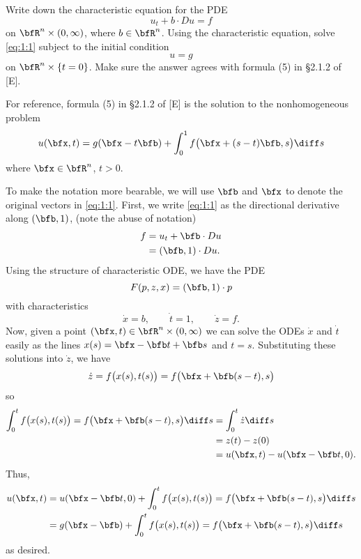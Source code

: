 \begin{problem}
  Write down the characteristic equation for the PDE
  \[
    \label{eq:1:1}
    \tag{\(*\)}
    u_t+b\cdot Du=f
  \]
  on \(\bfR^n\times(0,\infty)\), where \(b\in\bfR^n\). Using the
  characteristic equation, solve \eqref{eq:1:1} subject to the initial
  condition
  \[
    u=g
  \]
  on \(\bfR^n\times\{t=0\}\). Make sure the answer agrees with formula (5)
  in \S 2.1.2 of [E].
\end{problem}
\begin{solution}
  For reference, formula (5) in \S 2.1.2 of [E] is the solution to the
  nonhomogeneous problem
  \[
    u(\bfx,t)=g(\bfx-t\bfb)+\int_0^1 f\bigl(\bfx+(s-t)\bfb,s\bigr)\diff s
  \]
  where \(\bfx\in\bfR^n\), \(t>0\).

  To make the notation more bearable, we will use \(\bfb\) and \(\bfx\) to
  denote the original vectors in \eqref{eq:1:1}. First, we write
  \eqref{eq:1:1} as the directional derivative along \((\bfb,1)\), (note
  the abuse of notation)
  \begin{align*}
    f%
    &=u_t+\bfb\cdot Du\\
    &=(\bfb,1)\cdot Du.
  \end{align*}
  Using the structure of characteristic ODE, we have the PDE
  \[
    F(p,z,x)=(\bfb,1)\cdot p
  \]
  with characteristics
  \[
    \dot x=b,\qquad
    \dot t=1,\qquad
    \dot z=f.
  \]
  Now, given a point \((\bfx,t)\in\bfR^n\times(0,\infty)\) we can solve the
  ODEs \(\dot x\) and \(\dot t\) easily as the lines
  \(x(s)=\bfx-\bfb t+\bfb s\) and \(t=s\). Substituting these solutions
  into \(\dot z\), we have
  \[
    \dot z=f\bigl(x(s),t(s)\bigr)=f\bigl(\bfx+\bfb(s-t),s\bigr)
  \]
  so
  \begin{align*}
    \int_0^t f\bigl(x(s),t(s)\bigr)=f\bigl(\bfx+\bfb(s-t),s\bigr)\diff s
    &=\int_0^t \dot z\diff s\\
    &=z(t)-z(0)\\
    &= u(\bfx,t)-u(\bfx-\bfb t,0).
  \end{align*}
  Thus,
  \begin{align*}
    u(\bfx,t)
    &=u(\bfx-\bfb t,0)%
      +\int_0^t f\bigl(x(s),t(s)\bigr)=f\bigl(\bfx+\bfb(s-t),s\bigr)\diff
      s\\
    &=g(\bfx-\bfb)
      +\int_0^t f\bigl(x(s),t(s)\bigr)=f\bigl(\bfx+\bfb(s-t),s\bigr)\diff
      s
  \end{align*}
  as desired.
\end{solution}
\newpage

